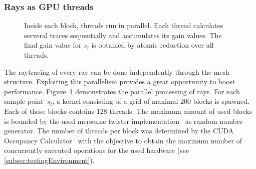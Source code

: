 \subsubsection{Rays as GPU threads}
\label{subsubsec:rays}
\begin{figure}[H]
  \centerline
      {}
  \caption{Inside each block, threads run in parallel.  Each thread
    calculates serveral traces sequentially and accumulates its gain
    values. The final gain value for $s_i$ is obtained by atomic
    reduction over all threads.}

  \label{graphic:kernel}
\end{figure}
    The raytracing of every ray can be done independently through the
    mesh structure.  Exploiting this parallelism provides a great
    opportunity to boost performance. Figure~\ref{graphic:kernel}
    demonstrates the parallel processing of rays. For each sample
    point~$s_i$, a kernel consisting of a grid of maximal 200 blocks
    is spawned. Each of those blocks contains 128 threads.  The
    maximum amount of used blocks is bounded by the used mersenne
    twister implementation~\cite{mersenne_twister} as random number
    generator.  The number of threads per block was determined by the
    CUDA Occupancy Calculator~\cite{occupancy_calculator} with the
    objective to obtain the maximum number of concurrently executed
    operations for the used hardware (see
    \cref{subsec:testingEnvironment}).
    
